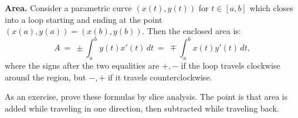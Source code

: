 \documentclass[11pt]{article}
\begin{document}
\noindent
{\bf Area.}  Consider a parametric curve $(x(t),y(t))$ for $t\in [a,b]$
which closes into a loop starting and ending at the point $(x(a),y(a))=(x(b),y(b))$.
Then the enclosed area is:
$$
A \ = \ \pm \int_a^b y(t) x'(t)\,dt \ =\ \mp \int_a^b x(t) y'(t)\,dt,
$$
where the signs after the two equalities are $+,-$ if the loop travels clockwise around the region, 
but $-,+$ if it travels  counterclockwise.

As an exercise, prove these formulas by slice analysis. 
The point is that area is added while traveling in one direction,
then subtracted while traveling back.
\end{document}
